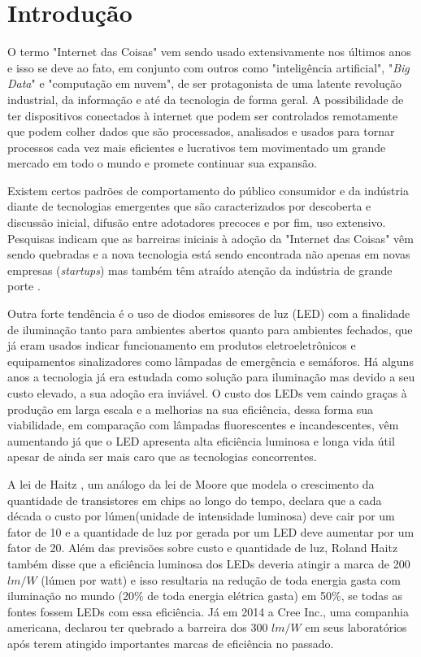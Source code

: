 \chapter{Introdução}

O termo "Internet das Coisas" \space vem sendo usado extensivamente nos últimos anos e isso se deve ao fato, em conjunto com outros como "inteligência artificial", "\textit{Big Data}" \space e "computação em nuvem", de ser protagonista de uma latente revolução industrial, da informação e até da tecnologia de forma geral. A possibilidade de ter dispositivos conectados à internet que podem ser controlados remotamente que podem colher dados que são processados, analisados e usados para tornar processos cada vez mais eficientes e lucrativos tem movimentado um grande mercado em todo o mundo e promete continuar sua expansão. 

Existem certos padrões de comportamento do público consumidor e da indústria diante de  tecnologias emergentes que são caracterizados por descoberta e discussão inicial, difusão entre adotadores precoces e por fim, uso extensivo. Pesquisas indicam que as barreiras iniciais à adoção da "Internet das Coisas" \space vêm sendo quebradas e a nova tecnologia está sendo encontrada não apenas em novas empresas (\textit{startups}) mas também têm atraído atenção da indústria de grande porte \cite{forbes}. 

Outra forte tendência é o uso de diodos emissores de luz (LED) com a finalidade de iluminação tanto para ambientes abertos quanto para ambientes fechados, que já eram usados indicar funcionamento em produtos eletroeletrônicos e equipamentos sinalizadores como lâmpadas de emergência e semáforos. Há alguns anos a tecnologia já era estudada como solução para iluminação mas devido a seu custo elevado, a sua adoção era inviável. O custo dos LEDs vem caindo graças à produção em larga escala e a melhorias na sua eficiência, dessa forma sua viabilidade, em comparação com lâmpadas fluorescentes e incandescentes, vêm aumentando já que o LED apresenta alta eficiência luminosa e longa vida útil apesar de ainda ser mais caro que as tecnologias concorrentes.

A lei de Haitz \cite{haitz}, um análogo da lei de Moore que modela o crescimento da quantidade de transistores em chips ao longo do tempo, declara que a cada década o custo por lúmen(unidade de intensidade luminosa) deve cair por um fator de 10 e a quantidade de luz por gerada por um LED deve aumentar por um fator de 20. Além das previsões sobre custo e quantidade de luz, Roland Haitz também disse que a eficiência luminosa dos LEDs deveria atingir a marca de 200 $lm/W$ (lúmen por watt) e isso resultaria na redução de toda energia gasta com iluminação no mundo (20\% de toda energia elétrica gasta) em 50\%, se todas as fontes fossem LEDs com essa eficiência. Já em 2014 a Cree Inc., uma companhia americana, declarou ter quebrado a barreira dos 300 $lm/W$ \cite{cree} em seus laboratórios após terem atingido importantes marcas de eficiência no passado.

